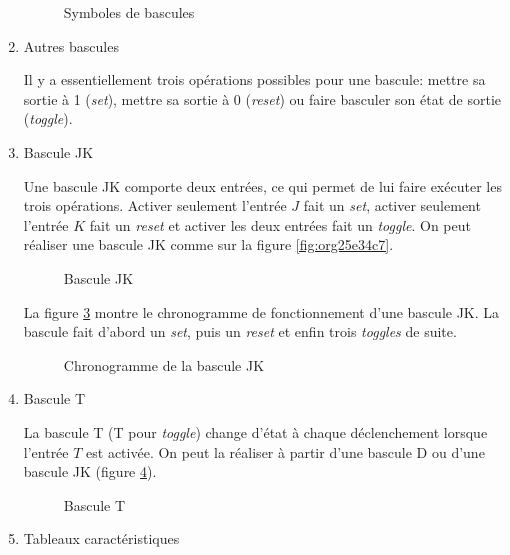 \documentclass[letter, oneside]{book}
\begin{document}
\begin{enumerate}
\begin{figure}[htbp]
\centering

\caption{\label{fig:orgb3adc16}Symboles de bascules}
\end{figure}

\item Autres bascules
\label{sec:orgb73900e}

Il y a essentiellement trois opérations possibles pour une bascule:
mettre sa sortie à 1 (\emph{set}), mettre sa sortie à 0 (\emph{reset}) ou faire
basculer son état de sortie (\emph{toggle}).

\item Bascule JK
\label{sec:org2417a2e}

Une bascule JK comporte deux entrées, ce qui permet de lui faire
exécuter les trois opérations. Activer seulement l'entrée \(J\) fait
un \emph{set}, activer seulement l'entrée \(K\) fait un \emph{reset} et activer
les deux entrées fait un \emph{toggle}. On peut réaliser une bascule JK
comme sur la figure \ref{fig:org25e34c7}.

\begin{figure}[htbp]
\centering

\caption{\label{fig:orga71ba80}Bascule JK}
\end{figure}

La figure \ref{fig:orgfca610c} montre le chronogramme de fonctionnement
d'une bascule JK. La bascule fait d'abord un \emph{set}, puis un \emph{reset} et
enfin trois \emph{toggles} de suite.

\begin{figure}[htbp]
\centering

\caption{\label{fig:orgfca610c}Chronogramme de la bascule JK}
\end{figure}

\item Bascule T
\label{sec:org44d7bb6}

La bascule T (T pour \emph{toggle}) change d'état à chaque déclenchement
lorsque l'entrée \(T\) est activée. On peut la réaliser à partir d'une
bascule D ou d'une bascule JK (figure \ref{fig:orgf2ef53d}).

\begin{figure}[htbp]
\centering

\caption{\label{fig:orgf2ef53d}Bascule T}
\end{figure}

\item Tableaux caractéristiques
\label{sec:orgff93baf}


\end{enumerate}
\end{document}
